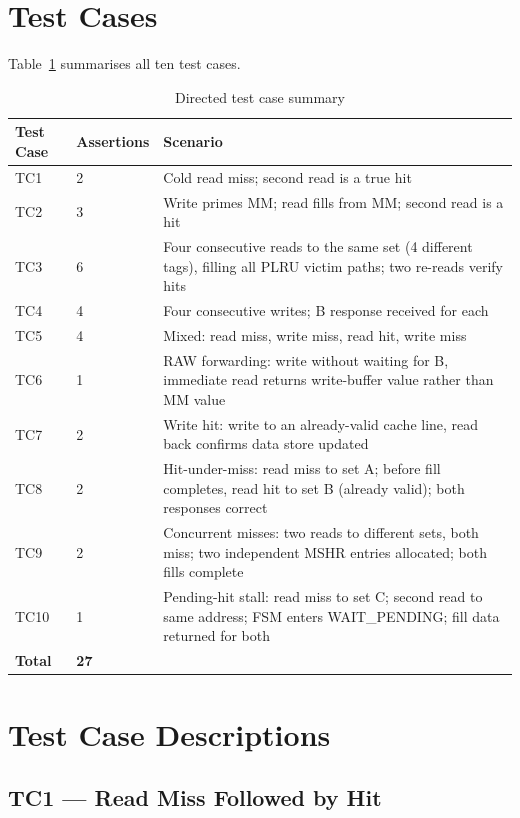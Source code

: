 \documentclass[12pt,letterpaper]{report}
\begin{document}
\section{Test Cases}
\label{sec:tcs}

Table~\ref{tab:tcs} summarises all ten test cases.

\begin{table}[h]
\centering
\caption{Directed test case summary}
\label{tab:tcs}
\begin{tabularx}{\linewidth}{@{}llX@{}}
\toprule
Test Case & Assertions & Scenario \\
\midrule
TC1  & 2 & Cold read miss; second read is a true hit \\
TC2  & 3 & Write primes MM; read fills from MM; second read is a hit \\
TC3  & 6 & Four consecutive reads to the same set (4 different tags),
           filling all PLRU victim paths; two re-reads verify hits \\
TC4  & 4 & Four consecutive writes; B response received for each \\
TC5  & 4 & Mixed: read miss, write miss, read hit, write miss \\
TC6  & 1 & RAW forwarding: write without waiting for B, immediate
           read returns write-buffer value rather than MM value \\
TC7  & 2 & Write hit: write to an already-valid cache line, read back
           confirms data store updated \\
TC8  & 2 & Hit-under-miss: read miss to set A; before fill completes,
           read hit to set B (already valid); both responses correct \\
TC9  & 2 & Concurrent misses: two reads to different sets, both miss;
           two independent MSHR entries allocated; both fills complete \\
TC10 & 1 & Pending-hit stall: read miss to set C; second read to same
           address; FSM enters WAIT\_PENDING; fill data returned for both \\
\midrule
\textbf{Total} & \textbf{27} & \\
\bottomrule
\end{tabularx}
\end{table}

\section{Test Case Descriptions}

\subsection{TC1 — Read Miss Followed by Hit}
\end{document}
